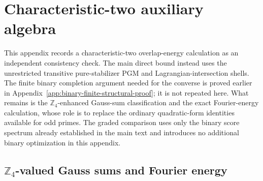 \documentclass[11pt]{article}
\newcommand{\1}{\mathbf 1}
\theoremstyle{plain}
\theoremstyle{definition}
\theoremstyle{remark}
\begin{document}
\section{Characteristic-two auxiliary algebra}
\label{app:characteristic-two-algebra}
This appendix records a characteristic-two overlap-energy calculation as an independent consistency check.  The main direct bound instead uses the unrestricted transitive pure-stabilizer PGM and Lagrangian-intersection shells.  The finite binary completion argument needed for the converse is proved earlier in Appendix~\ref{app:binary-finite-structural-proof}; it is not repeated here.  What remains is the $\mathbb Z_4$-enhanced Gauss-sum classification and the exact Fourier-energy calculation, whose role is to replace the ordinary quadratic-form identities available for odd primes.  The graded comparison uses only the binary score spectrum already established in the main text and introduces no additional binary optimization in this appendix.

\subsection{\texorpdfstring{$\mathbb Z_4$}{Z4}-valued Gauss sums and Fourier energy}
\label{subsec:integrated-qubit-gauss-achievability}
\end{document}
